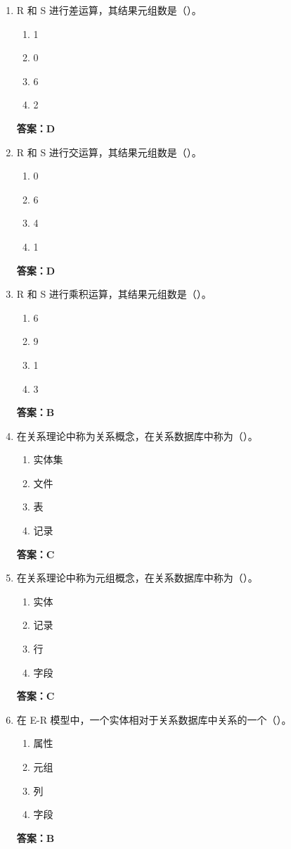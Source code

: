 \documentclass[12pt, a4paper]{article}
\begin{document}
\begin{enumerate}[label=\arabic*.]
	\item R 和 S 进行差运算，其结果元组数是（\quad）。
	      \begin{enumerate}
		      \item 1
		      \item 0
		      \item 6
		      \item 2
	      \end{enumerate}
	      \textbf{答案：D}

	\item R 和 S 进行交运算，其结果元组数是（\quad）。
	      \begin{enumerate}
		      \item 0
		      \item 6
		      \item 4
		      \item 1
	      \end{enumerate}
	      \textbf{答案：D}

	\item R 和 S 进行乘积运算，其结果元组数是（\quad）。
	      \begin{enumerate}
		      \item 6
		      \item 9
		      \item 1
		      \item 3
	      \end{enumerate}
	      \textbf{答案：B}

	\item 在关系理论中称为关系概念，在关系数据库中称为（\quad）。
	      \begin{enumerate}
		      \item 实体集
		      \item 文件
		      \item 表
		      \item 记录
	      \end{enumerate}
	      \textbf{答案：C}

	\item 在关系理论中称为元组概念，在关系数据库中称为（\quad）。
	      \begin{enumerate}
		      \item 实体
		      \item 记录
		      \item 行
		      \item 字段
	      \end{enumerate}
	      \textbf{答案：C}

	\item 在 E-R 模型中，一个实体相对于关系数据库中关系的一个（\quad）。
	      \begin{enumerate}
		      \item 属性
		      \item 元组
		      \item 列
		      \item 字段
	      \end{enumerate}
	      \textbf{答案：B}


\end{enumerate}
\end{document}
